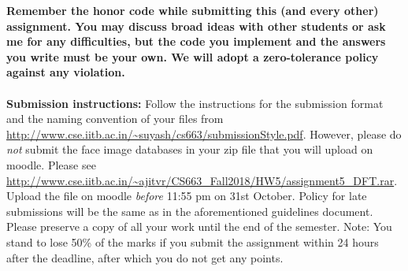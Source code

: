 \documentclass[11pt]{article}
\begin{document}
\maketitle

\textbf{Remember the honor code while submitting this (and every other) assignment. You may discuss broad ideas with other students or ask me for any difficulties, but the code you implement and the answers you write must be your own. We will adopt a \textbf{zero-tolerance policy} against any violation.}
\\
\\
\textbf{Submission instructions:} Follow the instructions for the submission format and the naming convention of your files from \url{http://www.cse.iitb.ac.in/~suyash/cs663/submissionStyle.pdf}. However, please do \emph{not} submit the face image databases in your zip file that you will upload on moodle. Please see \url{http://www.cse.iitb.ac.in/~ajitvr/CS663_Fall2018/HW5/assignment5_DFT.rar}. Upload the file on moodle \emph{before} 11:55 pm on 31st October. Policy for late submissions will be the same as in the aforementioned guidelines document. Please preserve a copy of all your work until the end of the semester. Note: You stand to lose 50\% of the
marks if you submit the assignment within 24 hours after the deadline, after which you do not get any points.
\end{document}

